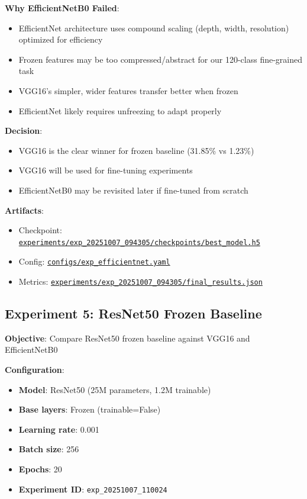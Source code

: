 \documentclass[
  letterpaper,
  DIV=11,
  numbers=noendperiod]{scrartcl}
\providecommand{\tightlist}{%
  \setlength{\itemsep}{0pt}\setlength{\parskip}{0pt}}
\begin{document}
\textbf{Why EfficientNetB0 Failed}:

\begin{itemize}
\tightlist
\item
  EfficientNet architecture uses compound scaling (depth, width,
  resolution) optimized for efficiency
\item
  Frozen features may be too compressed/abstract for our 120-class
  fine-grained task
\item
  VGG16's simpler, wider features transfer better when frozen
\item
  EfficientNet likely requires unfreezing to adapt properly
\end{itemize}

\textbf{Decision}:

\begin{itemize}
\tightlist
\item
  VGG16 is the clear winner for frozen baseline (31.85\% vs 1.23\%)
\item
  VGG16 will be used for fine-tuning experiments
\item
  EfficientNetB0 may be revisited later if fine-tuned from scratch
\end{itemize}

\textbf{Artifacts}:

\begin{itemize}
\tightlist
\item
  Checkpoint:
  \href{../experiments/exp_20251007_094305/checkpoints/best_model.h5}{\texttt{experiments/exp\_20251007\_094305/checkpoints/best\_model.h5}}
\item
  Config:
  \href{../configs/exp_efficientnet.yaml}{\texttt{configs/exp\_efficientnet.yaml}}
\item
  Metrics:
  \href{../experiments/exp_20251007_094305/final_results.json}{\texttt{experiments/exp\_20251007\_094305/final\_results.json}}
\end{itemize}

\subsection{Experiment 5: ResNet50 Frozen
Baseline}\label{experiment-5-resnet50-frozen-baseline}

\textbf{Objective}: Compare ResNet50 frozen baseline against VGG16 and
EfficientNetB0

\textbf{Configuration}:

\begin{itemize}
\tightlist
\item
  \textbf{Model}: ResNet50 (25M parameters, 1.2M trainable)
\item
  \textbf{Base layers}: Frozen (trainable=False)
\item
  \textbf{Learning rate}: 0.001
\item
  \textbf{Batch size}: 256
\item
  \textbf{Epochs}: 20
\item
  \textbf{Experiment ID}: \texttt{exp\_20251007\_110024}
\end{itemize}
\end{document}
